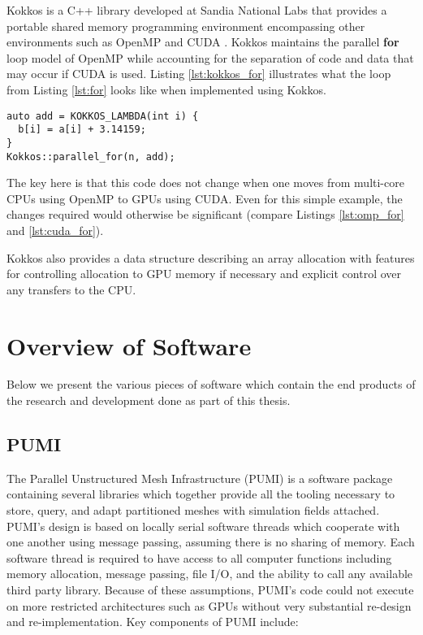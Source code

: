 Kokkos is a C++ library developed at Sandia National Labs that provides
a portable shared memory programming environment encompassing other
environments such as OpenMP and CUDA \cite{edwards2013kokkos}.
Kokkos maintains the parallel {\bf for} loop model of OpenMP while
accounting for the separation of code and data that may occur if CUDA is used.
Listing \ref{lst:kokkos_for} illustrates what the loop from Listing
\ref{lst:for} looks like when implemented using Kokkos.

\begin{lstlisting}[float,style=dan-style,caption=Kokkos {\bf for} loop,label=lst:kokkos_for]
auto add = KOKKOS_LAMBDA(int i) {
  b[i] = a[i] + 3.14159;
}
Kokkos::parallel_for(n, add);
\end{lstlisting}

The key here is that this code does not change when one moves
from multi-core CPUs using OpenMP to GPUs using CUDA.
Even for this simple example, the changes required would otherwise
be significant (compare Listings \ref{lst:omp_for} and \ref{lst:cuda_for}).

Kokkos also provides a data structure describing an array allocation
with features for controlling allocation to GPU memory if necessary
and explicit control over any transfers to the CPU.

\section{Overview of Software}

Below we present the various pieces of software which contain
the end products of the research and development done as
part of this thesis.

\subsection{PUMI}

The Parallel Unstructured Mesh Infrastructure (PUMI) is a software package
containing several libraries which together provide all the tooling
necessary to store, query, and adapt partitioned meshes with
simulation fields attached.
PUMI's design is based on locally serial software threads which
cooperate with one another using message passing, assuming
there is no sharing of memory.
Each software thread is required to have access to all computer
functions including memory allocation, message passing, file I/O, and the ability
to call any available third party library.
Because of these assumptions, PUMI's code could not execute
on more restricted architectures such as GPUs without very
substantial re-design and re-implementation.
Key components of PUMI include:

